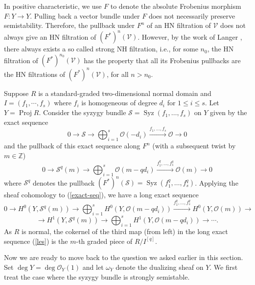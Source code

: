 \documentclass[draft]{amsart}
\theoremstyle{definition}
\numberwithin{equation}{theorem}
\begin{document}
In positive characteristic, we use $F$ to denote the absolute Frobenius morphism $F: Y {\longrightarrow} Y$. Pulling back a vector bundle under $F$ 
does not necessarily preserve semistability. Therefore, the
pullback under $F^n$ of an HN filtration of
${\mathcal{V}}$ does not always give an HN filtration of
$(F^*)^n({\mathcal{V}})$. However, by the work of Langer \cite{La}, there always exists a so called strong NH filtration,
i.e., for some $n_0$, the HN filtration of $(F^*)^{n_0}({\mathcal{V}})$ has the property that all its
Frobenius pullbacks are the HN filtrations of $(F^*)^n({\mathcal{V}})$, for all
$n>n_0$. 

Suppose $R$ is a standard-graded two-dimensional normal domain and $I=(f_1,\cdots, f_s)$ where $f_i$ is homogeneous of degree $d_i$ for $1\leq i \leq s$.
Let $Y={\mathop{\mathrm{Proj}}\nolimits} R$. Consider the syzygy
bundle ${\mathcal{S}}={\mathop{\mathrm{Syz}}\nolimits}(f_1, \dots, f_s)$ on $Y$ given by the exact sequence
\begin{equation}
\label{def-syzygy}
0{\longrightarrow} {\mathcal{S}} {\longrightarrow} \bigoplus_{i=1}^s {\mathcal{O}}(-d_i) 
\overset{f_1, \ldots, f_s} {\longrightarrow} {\mathcal{O}} {\longrightarrow} 0
\end{equation} 
and the pullback of this exact sequence along 
$F^n$ (with a subsequent
twist by $m\in \mathbb Z$)
\begin{equation}
\label{exact-seq}
0{\longrightarrow} {\mathcal{S}}^q(m) {\longrightarrow} \bigoplus_{i=1}^s {\mathcal{O}}(m-qd_i) 
\overset{f_1^q, \dots, f_s^q} {\longrightarrow} {\mathcal{O}}(m) {\longrightarrow} 0
\end{equation} 
where ${\mathcal{S}}^q$ denotes the pullback $(F^*)^n({\mathcal{S}}) = {\mathop{\mathrm{Syz}}\nolimits} (f_1^q, \dots, f_s^q)$.  Applying the sheaf cohomology to (\ref{exact-seq}), we have a long exact sequence
\begin{equation}\label{les}
0\to H^0(Y, {\mathcal{S}}^q(m)) \to \bigoplus_{i=1}^s H^0(Y, {\mathcal{O}}(m-qd_i)) \stackrel{f_1^q
, \ldots, f_s^q} {\longrightarrow} H^0(Y, {\mathcal{O}}(m)) \to
  \end{equation}
 \[ \to H^1(Y, {\mathcal{S}}^q(m)) \to \bigoplus_{i=1}^s H^1(Y,  {\mathcal{O}}(m-qd_i)) \to \cdots.\]
As $R$ is normal, the cokernel of the third map (from left)
in the long exact sequence (\ref{les})
is the $m$-th graded piece of $R/I^{[q]}$. 

Now we are ready to move back to the question we asked earlier in this section. Set $\deg Y= \deg {\mathcal{O}}_Y(1)$ and let $\omega_Y$ denote the dualizing sheaf on $Y$.
We first treat the case where the syzygy bundle is strongly semistable. 
\end{document}
